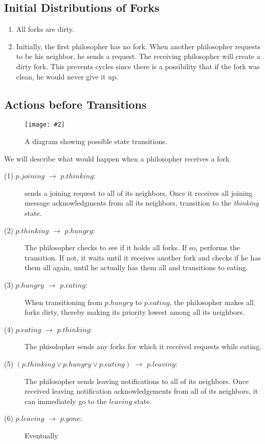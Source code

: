 \documentclass[11pt]{article}
\newcommand{\pic}[2]{\begin{center}\texttt{[image: \#2]}\end{center}}
\begin{document}
\subsection{Initial Distributions of Forks}
\begin{enumerate}
\item All forks are dirty.
\item Initially, the first philosopher has no fork. When another philosopher requests to be his neighbor, he sends a request. The receiving philosopher will create a dirty fork. This prevents cycles since there is a possibility that if the fork was clean, he would never give it up.
\end{enumerate}

\subsection{Actions before Transitions}
\begin{figure}[H]
\pic{0.6}{diagram}
\label{fig:diagram}
\caption{A diagram showing possible state transitions.}
\end{figure}

We will describe what would happen when a philosopher receives a fork.


\begin{description}
\item[(1) $p.joining$ $\to$ $p.thinking$:] sends a joining request to all of its neighbors. Once it receives all joining message acknowledgments from all its neighbors, transition to the \textit{thinking} state.

\item[(2) $p.thinking$ $\to$ $p.hungry$:]
The philosopher checks to see if it holds all forks. If so, performs the transition. If not, it waits until it receives another fork and checks if he has them all again, until he actually has them all and transitions to eating.

\item[(3) $p.hungry$ $\to$ $p.eating$:] 
When transitioning from $p.hungry$ to $p.eating$, the philosopher makes all forks dirty, thereby making its priority lowest among all its neighbors.


\item[(4) $p.eating$ $\to$ $p.thinking$:]
The phisolopher sends any forks for which it received requests while eating.

\item[(5) $(p.thinking \vee p.hungry \vee p.eating)$ $\to$ $p.leaving$:]
The philosopher sends leaving notifications to all of its neighbors.
Once received leaving notification acknowledgements from all of its neighbors,
it can immediately go to the $leaving$ state.

\item[(6) $p.leaving$ $\to$ $p.gone$:]
Eventually
\end{description}
\end{document}
